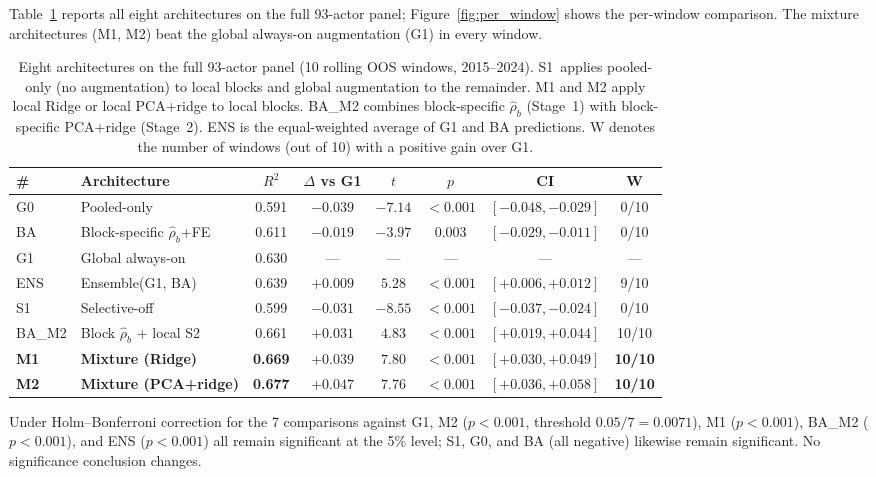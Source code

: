 \documentclass[11pt,a4paper]{article}
\begin{document}
Table~\ref{tab:five_arch} reports all eight architectures on the full 93-actor panel; Figure~\ref{fig:per_window} shows the per-window comparison. The mixture architectures (M1, M2) beat the global always-on augmentation (G1) in every window.

\begin{table}[H]
\centering
\caption{Eight architectures on the full 93-actor panel (10 rolling OOS windows, 2015--2024). S1~applies pooled-only (no augmentation) to local blocks and global augmentation to the remainder. M1 and M2 apply local Ridge or local PCA+ridge to local blocks. BA\_M2 combines block-specific $\hat\rho_b$ (Stage~1) with block-specific PCA+ridge (Stage~2). ENS is the equal-weighted average of G1 and BA predictions. W denotes the number of windows (out of 10) with a positive gain over G1.}
\label{tab:five_arch}
\small
\begin{tabular}{llcccccc}
\toprule
\# & Architecture & $R^2$ & $\Delta$ vs G1 & $t$ & $p$ & CI & W \\
\midrule
G0 & Pooled-only & 0.591 & $-0.039$ & $-7.14$ & ${<}0.001$ & $[-0.048, -0.029]$ & 0/10 \\
BA & Block-specific $\hat\rho_b$+FE & 0.611 & $-0.019$ & $-3.97$ & $0.003$ & $[-0.029, -0.011]$ & 0/10 \\
G1 & Global always-on & 0.630 & --- & --- & --- & --- & --- \\
ENS & Ensemble(G1, BA) & 0.639 & $+0.009$ & $5.28$ & ${<}0.001$ & $[+0.006, +0.012]$ & 9/10 \\
S1 & Selective-off & 0.599 & $-0.031$ & $-8.55$ & ${<}0.001$ & $[-0.037, -0.024]$ & 0/10 \\
BA\_M2 & Block $\hat\rho_b$ + local S2 & 0.661 & $+0.031$ & $4.83$ & ${<}0.001$ & $[+0.019, +0.044]$ & 10/10 \\
\textbf{M1} & \textbf{Mixture (Ridge)} & \textbf{0.669} & $\mathbf{+0.039}$ & $\mathbf{7.80}$ & $\mathbf{{<}0.001}$ & $\mathbf{[+0.030, +0.049]}$ & \textbf{10/10} \\
\textbf{M2} & \textbf{Mixture (PCA+ridge)} & \textbf{0.677} & $\mathbf{+0.047}$ & $\mathbf{7.76}$ & $\mathbf{{<}0.001}$ & $\mathbf{[+0.036, +0.058]}$ & \textbf{10/10} \\
\bottomrule
\end{tabular}
\end{table}

Under Holm--Bonferroni correction for the 7 comparisons against G1, M2 ($p < 0.001$, threshold $0.05/7 = 0.0071$), M1 ($p < 0.001$), BA\_M2 ($p < 0.001$), and ENS ($p < 0.001$) all remain significant at the 5\% level; S1, G0, and BA (all negative) likewise remain significant. No significance conclusion changes.
\end{document}
